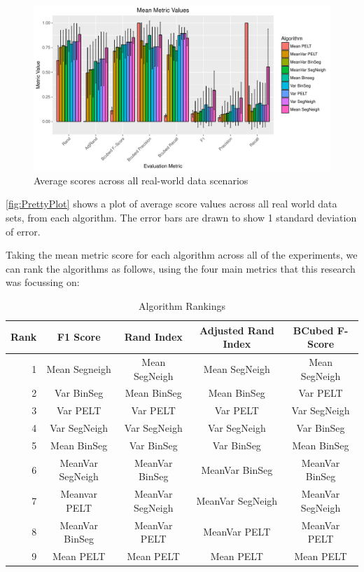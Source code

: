 \documentclass[../main.tex]{subfiles}
\begin{document}
\begin{figure}[h]
    \includegraphics[width=\textwidth]{figures/PrettyPlot2}
    \caption{Average scores across all real-world data scenarios}
    \label{fig:PrettyPlot}
\end{figure}

\autoref{fig:PrettyPlot} shows a plot of average score values across all real world data sets, from each algorithm. The error bars are drawn to show 1 standard deviation of error.

Taking the mean metric score for each algorithm across all of the experiments, we can rank the algorithms as follows, using the four main metrics that this research was focussing on:

\begin{table}[h]
\centering
\begin{tabular}{@{}rcccc@{}}
\toprule
\textbf{Rank} & \textbf{F1 Score} & \textbf{Rand Index} & \textbf{Adjusted Rand Index} & \textbf{BCubed F-Score} \\ \midrule
1 & Mean Segneigh & Mean SegNeigh & Mean SegNeigh & Mean SegNeigh \\
2 & Var BinSeg & Mean BinSeg & Mean BinSeg & Var PELT \\
3 & Var PELT & Var PELT & Var PELT & Var SegNeigh \\
4 & Var SegNeigh & Var SegNeigh & Var SegNeigh & Var BinSeg \\
5 & Mean BinSeg & Var BinSeg & Var BinSeg & Mean BinSeg \\
6 & MeanVar SegNeigh & MeanVar BinSeg & MeanVar BinSeg & MeanVar BinSeg \\
7 & Meanvar PELT & MeanVar SegNeigh & MeanVar SegNeigh & MeanVar SegNeigh \\
8 & MeanVar BinSeg & MeanVar PELT & MeanVar PELT & MeanVar PELT \\
9 & Mean PELT & Mean PELT & Mean PELT & Mean PELT \\ \bottomrule
\end{tabular}
\caption{Algorithm Rankings}
\label{tab:rankings}
\end{table}
\end{document}

